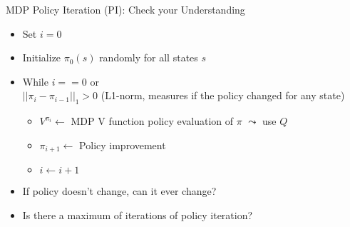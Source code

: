 \documentclass[aspectratio=169]{../latex_main/tntbeamer}  %
\begin{document}
\begin{frame}[c]{MDP Policy Iteration (PI): Check your Understanding}

\begin{itemize}
	\item Set $i=0$
	\item Initialize $\pi_0(s)$ randomly for all states $s$
	\item While $i == 0$ or\\ $||\pi_i - \pi_{i-1}||_1 > 0$ (L1-norm, measures if the policy changed for any state)
	\begin{itemize}
		\item $V^{\pi_i} \gets$ MDP V function policy \alert{evaluation} of $\pi$ \hspace{1em} $\leadsto$ use $Q$
		\item $\pi_{i+1} \gets$ Policy \alert{improvement}
		\item $i \gets i+1$
	\end{itemize}
	\item \alert{If policy doesn't change, can it ever change?}
	\item \alert{Is there a maximum of iterations of policy iteration?}
\end{itemize}

\end{frame}
\end{document}
